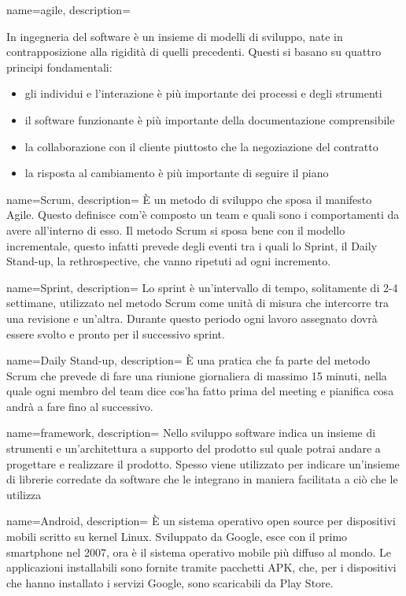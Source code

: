 {
  name=agile,
  description={ In ingegneria del software è un insieme di modelli di sviluppo, nate in contrapposizione alla rigidità di quelli precedenti.
  Questi si basano su quattro principi fondamentali: \begin{itemize}
    \item gli individui e l'interazione è più importante dei processi e degli strumenti
    \item il software funzionante è più importante della documentazione comprensibile
    \item la collaborazione con il cliente piuttosto che la negoziazione del contratto
    \item la risposta al cambiamento è più importante di seguire il piano
  \end{itemize}}
}

{
  name=Scrum,
  description={ È un metodo di sviluppo che sposa il manifesto \gls{Agile}. Questo definisce com'è composto un team e quali sono i
  comportamenti da avere all'interno di esso. Il metodo Scrum si sposa bene con il modello incrementale, questo infatti prevede degli eventi
  tra i quali lo \gls{Sprint}, il Daily Stand-up, la rethrospective, che vanno ripetuti ad ogni incremento.  }
}

{
  name=Sprint,
  description={ Lo sprint è un'intervallo di tempo, solitamente di 2-4 settimane, utilizzato nel metodo \gls{Scrum} come unità di misura che
  intercorre tra una revisione e un'altra. Durante questo periodo ogni lavoro assegnato dovrà essere svolto e pronto per il successivo sprint. }
}

{
  name=Daily Stand-up,
  description={ È una pratica che fa parte del metodo Scrum che prevede di fare una riunione giornaliera di massimo 15 minuti, nella quale
  ogni membro del team dice cos'ha fatto prima del meeting e pianifica cosa andrà a fare fino al successivo. }
}

{
  name=framework,
  description={ Nello sviluppo software indica un insieme di strumenti e un'architettura a supporto del prodotto sul quale potrai andare a
  progettare e realizzare il prodotto. Spesso viene utilizzato per indicare un'insieme di librerie corredate da software che le integrano in
  maniera facilitata a ciò che le utilizza }
}

{
  name=Android,
  description={ È un sistema operativo \gls{open source} per dispositivi mobili scritto su kernel Linux. Sviluppato da Google, esce con il primo
  smartphone nel 2007, ora è il sistema operativo mobile più diffuso al mondo. Le applicazioni installabili sono fornite tramite pacchetti
  APK, che, per i dispositivi che hanno installato i servizi Google, sono scaricabili da Play Store.}
}

